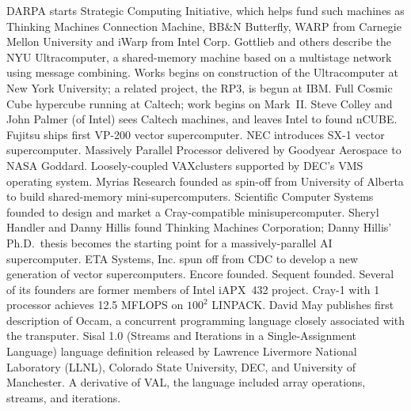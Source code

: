 	{DARPA starts Strategic Computing Initiative, which helps fund
	such machines as Thinking Machines Connection Machine,
	BB\&N Butterfly, WARP from Carnegie Mellon University
	and iWarp from Intel Corp.}
	{Gottlieb and others describe the NYU Ultracomputer,
	a shared-memory machine based on a multistage network
	using message combining.
	Works begins on construction of the Ultracomputer
	at New York University;
	a related project, the RP3, is begun at IBM.}
	{Full Cosmic Cube hypercube running at Caltech;
	work begins on Mark~II.
	Steve Colley and John Palmer (of Intel) sees Caltech machines,
	and leaves Intel to found nCUBE.}
	{Fujitsu ships first VP-200 vector supercomputer.}
	{NEC introduces SX-1 vector supercomputer.}
	{Massively Parallel Processor delivered by Goodyear Aerospace
	to NASA Goddard.}
	{Loosely-coupled VAXclusters supported by DEC's VMS operating system.}
	{Myrias Research founded as spin-off from University of Alberta
	to build shared-memory mini-supercomputers.}
	{Scientific Computer Systems founded to design
	and market a Cray-compatible minisupercomputer.}
	{Sheryl Handler and Danny Hillis found Thinking Machines Corporation;
	Danny Hillis' Ph.D.\ thesis becomes
	the starting point for a massively-parallel AI supercomputer.}
	{ETA Systems, Inc. spun off from CDC
	to develop a new generation of vector supercomputers.}
	{Encore founded.}
	{Sequent founded.
	Several of its founders
	are former members of Intel iAPX~432 project.}
	{Cray-1 with 1 processor achieves 12.5 MFLOPS
	on $100^2$ LINPACK.}
	{David May publishes first description of Occam,
	a concurrent programming language closely associated with the transputer.}
	{Sisal 1.0 (Streams and Iterations in a Single-Assignment Language)
	language definition released by
	Lawrence Livermore National Laboratory (LLNL),
	Colorado State University,
	DEC, and University of Manchester.
	A derivative of VAL, the language included array operations,
	streams, and iterations.}

